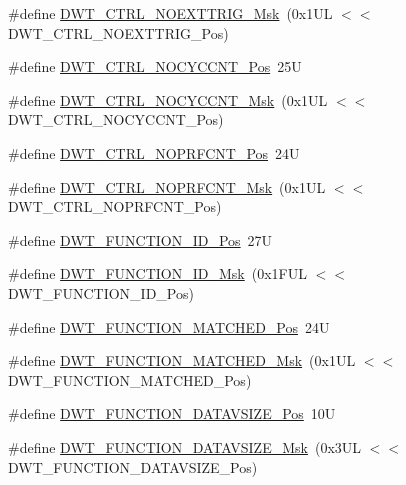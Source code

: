 \begin{DoxyCompactItemize}
\item 
\#define \mbox{\hyperlink{group___c_m_s_i_s___d_w_t_gacc7d15edf7a27147c422099ab475953e}{D\+W\+T\+\_\+\+C\+T\+R\+L\+\_\+\+N\+O\+E\+X\+T\+T\+R\+I\+G\+\_\+\+Msk}}~(0x1\+U\+L $<$$<$ D\+W\+T\+\_\+\+C\+T\+R\+L\+\_\+\+N\+O\+E\+X\+T\+T\+R\+I\+G\+\_\+\+Pos)
\item 
\#define \mbox{\hyperlink{group___c_m_s_i_s___d_w_t_ga337f6167d960f57f12aa382ffecce522}{D\+W\+T\+\_\+\+C\+T\+R\+L\+\_\+\+N\+O\+C\+Y\+C\+C\+N\+T\+\_\+\+Pos}}~25U
\item 
\#define \mbox{\hyperlink{group___c_m_s_i_s___d_w_t_gaf40c8d7a4fd978034c137e90f714c143}{D\+W\+T\+\_\+\+C\+T\+R\+L\+\_\+\+N\+O\+C\+Y\+C\+C\+N\+T\+\_\+\+Msk}}~(0x1\+U\+L $<$$<$ D\+W\+T\+\_\+\+C\+T\+R\+L\+\_\+\+N\+O\+C\+Y\+C\+C\+N\+T\+\_\+\+Pos)
\item 
\#define \mbox{\hyperlink{group___c_m_s_i_s___d_w_t_gad52a0e5be84363ab166cc17beca0d048}{D\+W\+T\+\_\+\+C\+T\+R\+L\+\_\+\+N\+O\+P\+R\+F\+C\+N\+T\+\_\+\+Pos}}~24U
\item 
\#define \mbox{\hyperlink{group___c_m_s_i_s___d_w_t_gafd8448d7db4bc51f27f202e6e1f27823}{D\+W\+T\+\_\+\+C\+T\+R\+L\+\_\+\+N\+O\+P\+R\+F\+C\+N\+T\+\_\+\+Msk}}~(0x1\+U\+L $<$$<$ D\+W\+T\+\_\+\+C\+T\+R\+L\+\_\+\+N\+O\+P\+R\+F\+C\+N\+T\+\_\+\+Pos)
\item 
\#define \mbox{\hyperlink{group___c_m_s_i_s___d_w_t_gae5dfe4049c2291e413f8713d7bd2bb1b}{D\+W\+T\+\_\+\+F\+U\+N\+C\+T\+I\+O\+N\+\_\+\+I\+D\+\_\+\+Pos}}~27U
\item 
\#define \mbox{\hyperlink{group___c_m_s_i_s___d_w_t_ga6bc2e15fcc300f511f64dad561c97582}{D\+W\+T\+\_\+\+F\+U\+N\+C\+T\+I\+O\+N\+\_\+\+I\+D\+\_\+\+Msk}}~(0x1\+F\+U\+L $<$$<$ D\+W\+T\+\_\+\+F\+U\+N\+C\+T\+I\+O\+N\+\_\+\+I\+D\+\_\+\+Pos)
\item 
\#define \mbox{\hyperlink{group___c_m_s_i_s___d_w_t_ga22c5787493f74a6bacf6ffb103a190ba}{D\+W\+T\+\_\+\+F\+U\+N\+C\+T\+I\+O\+N\+\_\+\+M\+A\+T\+C\+H\+E\+D\+\_\+\+Pos}}~24U
\item 
\#define \mbox{\hyperlink{group___c_m_s_i_s___d_w_t_gac8b1a655947490280709037808eec8ac}{D\+W\+T\+\_\+\+F\+U\+N\+C\+T\+I\+O\+N\+\_\+\+M\+A\+T\+C\+H\+E\+D\+\_\+\+Msk}}~(0x1\+U\+L $<$$<$ D\+W\+T\+\_\+\+F\+U\+N\+C\+T\+I\+O\+N\+\_\+\+M\+A\+T\+C\+H\+E\+D\+\_\+\+Pos)
\item 
\#define \mbox{\hyperlink{group___c_m_s_i_s___d_w_t_ga0517a186d4d448aa6416440f40fe7a4d}{D\+W\+T\+\_\+\+F\+U\+N\+C\+T\+I\+O\+N\+\_\+\+D\+A\+T\+A\+V\+S\+I\+Z\+E\+\_\+\+Pos}}~10U
\item 
\#define \mbox{\hyperlink{group___c_m_s_i_s___d_w_t_gaab42cbc1e6084c44d5de70971613ea76}{D\+W\+T\+\_\+\+F\+U\+N\+C\+T\+I\+O\+N\+\_\+\+D\+A\+T\+A\+V\+S\+I\+Z\+E\+\_\+\+Msk}}~(0x3\+U\+L $<$$<$ D\+W\+T\+\_\+\+F\+U\+N\+C\+T\+I\+O\+N\+\_\+\+D\+A\+T\+A\+V\+S\+I\+Z\+E\+\_\+\+Pos)

\end{DoxyCompactItemize}
